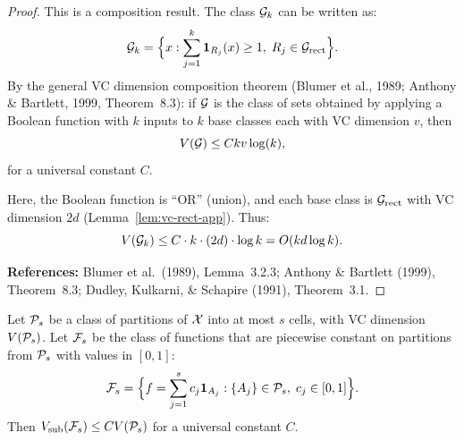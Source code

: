\documentclass[12pt]{article}
\begin{document}
\begin{proof}
This is a composition result. The class $\mathcal{G}_k$ can be written as:
\[
\mathcal{G}_k = \Bigl\{ x : \sum_{j=1}^k \mathbf{1}_{R_j}(x) \ge 1, \; R_j \in \mathcal{G}_{\text{rect}} \Bigr\}.
\]
By the general VC dimension composition theorem (Blumer et al., 1989; Anthony \& Bartlett, 1999, Theorem~8.3): if $\mathcal{G}$ is the class of sets obtained by applying a Boolean function with $k$ inputs to $k$ base classes each with VC dimension $v$, then
\[
V(\mathcal{G}) \le C k v \log(k),
\]
for a universal constant $C$.

Here, the Boolean function is ``OR'' (union), and each base class is $\mathcal{G}_{\text{rect}}$ with VC dimension $2d$ (Lemma~\ref{lem:vc-rect-app}). Thus:
\[
V(\mathcal{G}_k) \le C \cdot k \cdot (2d) \cdot \log k = O(kd \log k).
\]

\textbf{References:} Blumer et al.\ (1989), Lemma~3.2.3; Anthony \& Bartlett (1999), Theorem~8.3; Dudley, Kulkarni, \& Schapire (1991), Theorem~3.1.
\end{proof}

\begin{lemma}
\label{lem:pseudo-partition}
Let $\mathcal{P}_s$ be a class of partitions of $\mathcal{X}$ into at most $s$ cells, with VC dimension $V(\mathcal{P}_s)$. Let $\mathcal{F}_s$ be the class of functions that are piecewise constant on partitions from $\mathcal{P}_s$ with values in $[0,1]$:
\[
\mathcal{F}_s = \Bigl\{ f = \sum_{j=1}^s c_j \mathbf{1}_{A_j} : \{A_j\} \in \mathcal{P}_s, \; c_j \in [0,1] \Bigr\}.
\]
Then $V_{\text{sub}}(\mathcal{F}_s) \le C V(\mathcal{P}_s)$ for a universal constant $C$.
\end{lemma}
\end{document}
